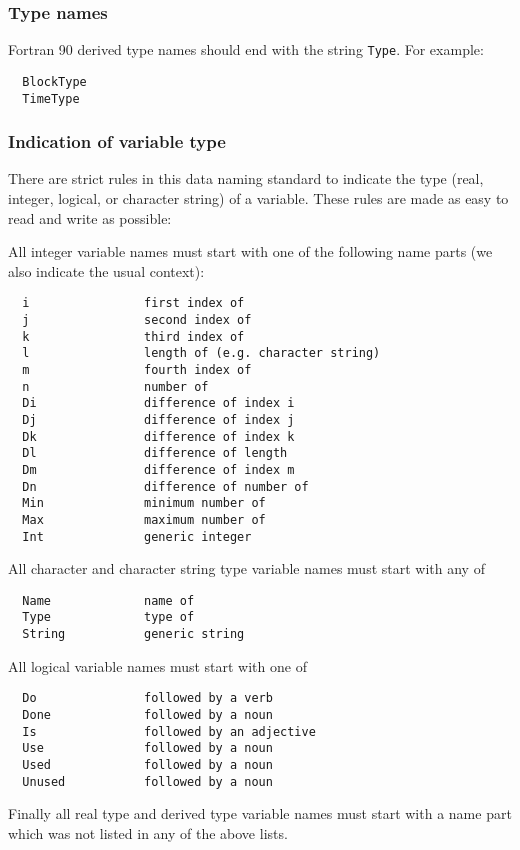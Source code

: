 \documentclass{article}
\begin{document}
\subsubsection{Type names}

Fortran 90 derived type names should end with the string {\tt Type}.
For example:
\begin{verbatim}
  BlockType
  TimeType
\end{verbatim}

\subsubsection{Indication of variable type}

There are strict rules in this data naming standard to indicate 
the type (real, integer, logical, or character string) of 
a variable. These rules are made as easy to read and write
as possible:

All integer variable names must start with one of the following name parts
(we also indicate the usual context):
\begin{verbatim}
  i                first index of
  j                second index of
  k                third index of
  l                length of (e.g. character string)
  m                fourth index of
  n                number of
  Di               difference of index i
  Dj               difference of index j
  Dk               difference of index k
  Dl               difference of length
  Dm               difference of index m
  Dn               difference of number of
  Min              minimum number of
  Max              maximum number of
  Int              generic integer
\end{verbatim}
All character and character string type variable names must start with
any of 
\begin{verbatim}
  Name             name of
  Type             type of
  String           generic string
\end{verbatim}
All logical variable names must start with one of
\begin{verbatim}
  Do               followed by a verb
  Done             followed by a noun
  Is               followed by an adjective
  Use              followed by a noun
  Used             followed by a noun
  Unused           followed by a noun
\end{verbatim}
Finally all real type and derived type variable names must start with a 
name part which was not listed in any of the above lists.
\end{document}
